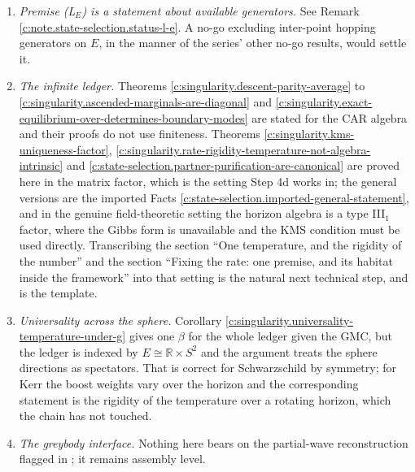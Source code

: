 \documentclass[11pt]{article}
\theoremstyle{definition}
\theoremstyle{plain}
\providecommand{\Cl}{}\renewcommand{\Cl}{\mathrm{Cl}}
\providecommand{\R}{}\renewcommand{\R}{\mathbb{R}}
\begin{document}
\begin{enumerate}
The live route to a better-placed premise runs through Step 3's landing zone instead. Bisognano-Wichmann does not assume the factor $2\pi$: it derives it, from the spectrum condition together with covariance and locality \cite{BW1976, Sewell1982}. The ascent lands in $\Cl(2,4)$, whose parabolic stabiliser of the adjoined null direction contains exactly the translations such a spectrum condition needs, so the premise could be restated as positivity of the ledger's energy with respect to a generator the ascent itself installed. That would still be an import, positivity of energy being no Clifford fact, but it would be stated in the algebra the chain produces rather than in the metric geometry. Transcribing the theorem needs an action of the relevant subgroup on the ledger, a wedge and locality structure, and analyticity of the state, each of which is real work and any of which could fail; the natural home is the twistor paper, not T6.
\item \emph{Premise (L$_E$) is a statement about available generators.} See Remark \ref{c:note.state-selection.status-l-e}. A no-go excluding inter-point hopping generators on $E$, in the manner of the series' other no-go results, would settle it.
\item \emph{The infinite ledger.} Theorems \ref{c:singularity.descent-parity-average} to \ref{c:singularity.ascended-marginals-are-diagonal} and \ref{c:singularity.exact-equilibrium-over-determines-boundary-modes} are stated for the CAR algebra and their proofs do not use finiteness. Theorems \ref{c:singularity.kms-uniqueness-factor}, \ref{c:singularity.rate-rigidity-temperature-not-algebra-intrinsic} and \ref{c:state-selection.partner-purification-are-canonical} are proved here in the matrix factor, which is the setting Step 4d works in; the general versions are the imported Facts \ref{c:state-selection.imported-general-statement}, and in the genuine field-theoretic setting the horizon algebra is a type III$_1$ factor, where the Gibbs form is unavailable and the KMS condition must be used directly. Transcribing the section ``One temperature, and the rigidity of the number'' and the section ``Fixing the rate: one premise, and its habitat inside the framework'' into that setting is the natural next technical step, and \cite{KayWald1991} is the template.
\item \emph{Universality across the sphere.} Corollary \ref{c:singularity.universality-temperature-under-g} gives one $\beta$ for the whole ledger given the GMC, but the ledger is indexed by $E \cong \R \times S^{2}$ and the argument treats the sphere directions as spectators. That is correct for Schwarzschild by symmetry; for Kerr the boost weights vary over the horizon and the corresponding statement is the rigidity of the temperature over a rotating horizon, which the chain has not touched.
\item \emph{The greybody interface.} Nothing here bears on the partial-wave reconstruction flagged in \cite[Rem.~8.3]{ButlerT5}; it remains assembly level.
\end{enumerate}
\end{document}
